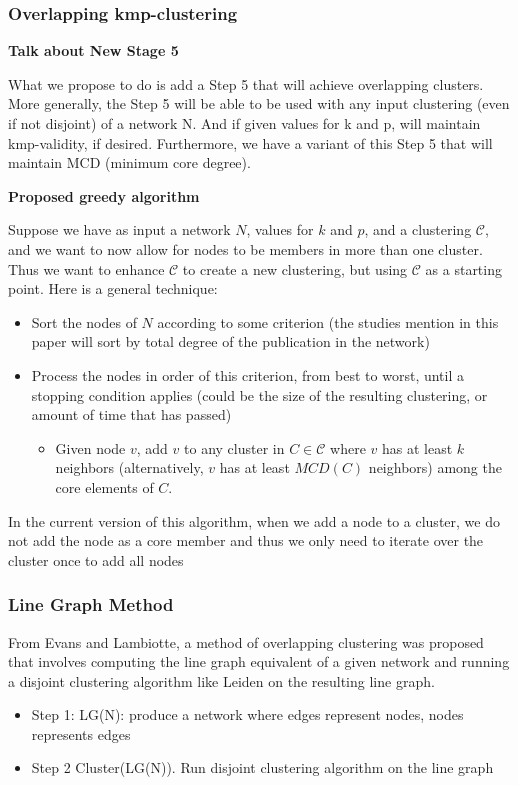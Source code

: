 \documentclass{article}
\begin{document}
\subsubsection{Overlapping kmp-clustering}

\textbf{Talk about New Stage 5}

What we propose to do is add a Step 5 that will achieve overlapping clusters. More generally, the Step 5 will be able to be used with any input clustering (even if not disjoint) of a network N. And if given values for k and p, will maintain kmp-validity, if desired. Furthermore, we have a variant of this Step 5 that will maintain MCD (minimum core degree).

\textbf{Proposed greedy algorithm}

Suppose we have as input a network $N$, values for $k$ and $p$, and a clustering $\mathcal{C}$, and we want to now allow for nodes to be members in more than one cluster.  Thus we want to enhance $\mathcal{C}$ to create a new clustering, but using $\mathcal{C}$ as a starting point.
Here is a general technique:

\begin{itemize}
	\item Sort the nodes of $N$ according to some criterion (the studies mention in this paper will sort by total degree of the publication in the network)
	\item Process the nodes in order of this criterion, from best to worst, until a stopping condition applies (could be the size of the resulting clustering, or amount of time that has passed)
	\begin{itemize}
		\item Given node $v$, add $v$ to any cluster in $C \in \mathcal{C}$ where $v$ has at least $k$ neighbors (alternatively, 
		$v$ has at least $MCD(C)$ neighbors) among the core elements of $C$.
	\end{itemize}
\end{itemize}

In the current version of this algorithm, when we add a node to a cluster, we do not add the node as a core member and thus we only need to iterate over the cluster once to add all nodes



\subsubsection{Line Graph Method}

From Evans and Lambiotte, a method of overlapping clustering was proposed that involves computing the line graph equivalent of a given network and running a disjoint clustering algorithm like Leiden on the resulting line graph. 
\begin{itemize}
	\item Step 1: LG(N): produce a network where edges represent nodes, nodes represents edges
	\item Step 2 Cluster(LG(N)). Run disjoint clustering algorithm on the line graph
\end{itemize}
\end{document}
